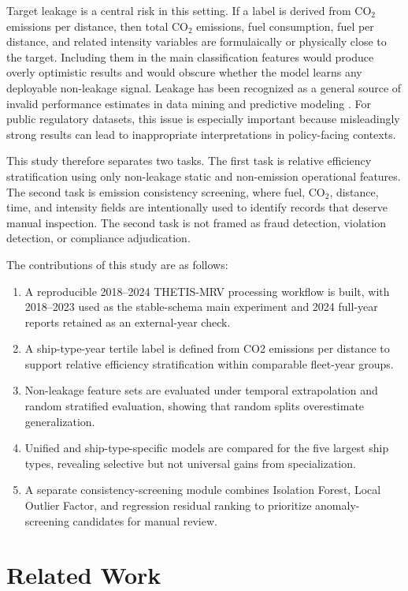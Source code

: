 \documentclass[preprints,article,submit,pdftex,oneauthor]{Definitions/mdpi}
\begin{document}
Target leakage is a central risk in this setting. If a label is derived from CO$_2$ emissions per distance, then total CO$_2$ emissions, fuel consumption, fuel per distance, and related intensity variables are formulaically or physically close to the target. Including them in the main classification features would produce overly optimistic results and would obscure whether the model learns any deployable non-leakage signal. Leakage has been recognized as a general source of invalid performance estimates in data mining and predictive modeling \cite{kaufman2012leakage}. For public regulatory datasets, this issue is especially important because misleadingly strong results can lead to inappropriate interpretations in policy-facing contexts.

This study therefore separates two tasks. The first task is relative efficiency stratification using only non-leakage static and non-emission operational features. The second task is emission consistency screening, where fuel, CO$_2$, distance, time, and intensity fields are intentionally used to identify records that deserve manual inspection. The second task is not framed as fraud detection, violation detection, or compliance adjudication.

The contributions of this study are as follows:
\begin{enumerate}
\item A reproducible 2018--2024 THETIS-MRV processing workflow is built, with 2018--2023 used as the stable-schema main experiment and 2024 full-year reports retained as an external-year check.
\item A ship-type-year tertile label is defined from CO2 emissions per distance to support relative efficiency stratification within comparable fleet-year groups.
\item Non-leakage feature sets are evaluated under temporal extrapolation and random stratified evaluation, showing that random splits overestimate generalization.
\item Unified and ship-type-specific models are compared for the five largest ship types, revealing selective but not universal gains from specialization.
\item A separate consistency-screening module combines Isolation Forest, Local Outlier Factor, and regression residual ranking to prioritize anomaly-screening candidates for manual review.
\end{enumerate}

\section{Related Work}
\end{document}
